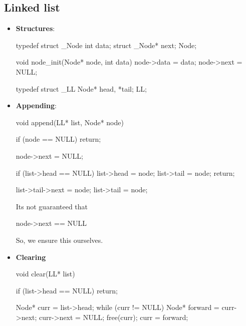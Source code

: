 \documentclass{report}
\begin{document}
    \subsection{Linked list}
    \begin{itemize}
        \item \textbf{Structures}:
            \bigbreak \noindent 
            \begin{cppcode}
                typedef struct _Node {
                    int data;
                    struct _Node* next;
                } Node;

                void node_init(Node* node, int data) {
                    node->data = data;
                    node->next = NULL;
                } 

                typedef struct _LL {
                    Node* head, *tail;
                } LL;
            \end{cppcode}
        \item \textbf{Appending}:
            \bigbreak \noindent 
            \begin{cppcode}
                void append(LL* list, Node* node) {
                    if (node == NULL) return;

                    node->next = NULL;

                    if (list->head == NULL) {
                        list->head = node;
                        list->tail = node;
                        return;
                    }

                    list->tail->next = node;
                    list->tail = node;
                }
            \end{cppcode}
            \bigbreak \noindent 
            Its not guaranteed that 
            \bigbreak \noindent 
            \begin{cppcode}
            node->next == NULL
            \end{cppcode}
            \bigbreak \noindent 
            So, we ensure this ourselves.
        \item \textbf{Clearing}
            \bigbreak \noindent 
            \begin{cppcode}
                void clear(LL* list) {
                    if (list->head == NULL) return;

                    Node* curr = list->head;
                    while (curr != NULL) {
                        Node* forward = curr->next;
                        curr->next = NULL;
                        free(curr);
                        curr = forward;
                    }

}
\end{cppcode}
\end{itemize}
\end{document}

